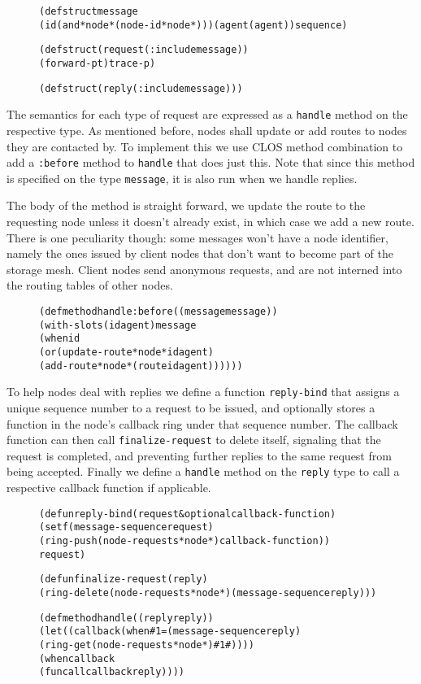 \documentclass [a4paper,12pt,oneside]{article}\usepackage [paper=a4paper,left=37.5264mm,right=37.5264mm,top=37.5264mm,bottom=37.5264mm]{geometry}\usepackage {graphicx}\usepackage {tabularx}\usepackage {alltt}\usepackage {float}\usepackage [section]{placeins}\usepackage {titling}\setlength {\droptitle }{-4em}\pretitle {\begin {flushright}\bfseries \LARGE }\posttitle {\end {flushright}}\preauthor {\begin {flushright}}\postauthor {\end {flushright}}\predate {\begin {flushright}}\postdate {\end {flushright}}\usepackage [english]{babel}\usepackage [T1]{fontenc}\usepackage [utf8x]{inputenc}\usepackage {stmaryrd}\usepackage {amsfonts}\DeclareUnicodeCharacter {12314}{$\llbracket $}\DeclareUnicodeCharacter {12315}{$\rrbracket $}\DeclareUnicodeCharacter {9655}{$\rhd $}\newcommand \nobreakdash {\mbox {-}}\DeclareUnicodeCharacter {8209}{\nobreakdash }\usepackage [sc]{mathpazo}\linespread {1.05}\usepackage [font={small},labelformat=empty,labelsep=none]{caption}\tolerance=10000 \clubpenalty=10000 \widowpenalty=10000 \frenchspacing
\begin{document}
\begin {figure}[H]\centering \begin {alltt}
(defstruct message
  (id (and *node* (node-id *node*))) (agent (agent)) sequence)

(defstruct (request (:include message))
  (forward-p t) trace-p)

(defstruct (reply (:include message)))
\end{alltt}\vspace {-1em}\end {figure}

The semantics for each type of request are expressed as a \texttt {handle} method on the respective type. As mentioned before, nodes shall update or add routes to nodes they are contacted by. To implement this we use CLOS method combination to add a \texttt {:before} method to \texttt {handle} that does just this. Note that since this method is specified on the type \texttt {message}, it is also run when we handle replies.

The body of the method is straight forward, we update the route to the requesting node unless it doesn’t already exist, in which case we add a new route. There is one peculiarity though: some messages won’t have a node identifier, namely the ones issued by client nodes that don’t want to become part of the storage mesh. Client nodes send anonymous requests, and are not interned into the routing tables of other nodes.

\begin {figure}[H]\centering \begin {alltt}
(defmethod handle :before ((message message))
  (with-slots (id agent) message
    (when id
      (or (update-route *node* id agent)
          (add-route *node* (route id agent))))))
\end{alltt}\vspace {-1em}\end {figure}

To help nodes deal with replies we define a function \texttt {reply-bind} that assigns a unique sequence number to a request to be issued, and optionally stores a function in the node’s callback ring under that sequence number. The callback function can then call \texttt {finalize-request} to delete itself, signaling that the request is completed, and preventing further replies to the same request from being accepted. Finally we define a \texttt {handle} method on the \texttt {reply} type to call a respective callback function if applicable.

\begin {figure}[H]\centering \begin {alltt}
(defun reply-bind (request \&optional callback-function)
  (setf (message-sequence request)
        (ring-push (node-requests *node*) callback-function))
  request)

(defun finalize-request (reply)
  (ring-delete (node-requests *node*) (message-sequence reply)))

(defmethod handle ((reply reply))
  (let ((callback (when \#1=(message-sequence reply)
                    (ring-get (node-requests *node*) \#1\#))))
    (when callback
      (funcall callback reply))))
\end{alltt}\vspace {-1em}\end {figure}
\end{document}
